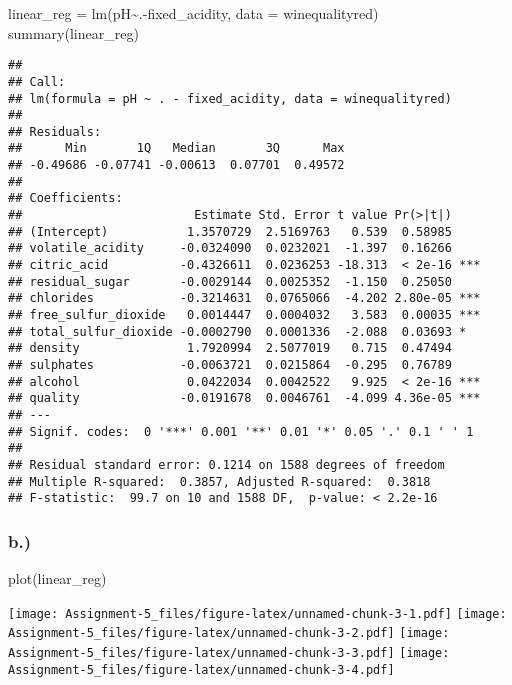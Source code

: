 \documentclass[
]{article}
\newenvironment{Shaded}{\begin{snugshade}}{\end{snugshade}}
\newcommand{\AttributeTok}[1]{\textcolor[rgb]{0.77,0.63,0.00}{#1}}
\newcommand{\FunctionTok}[1]{\textcolor[rgb]{0.00,0.00,0.00}{#1}}
\newcommand{\NormalTok}[1]{#1}
\newcommand{\OtherTok}[1]{\textcolor[rgb]{0.56,0.35,0.01}{#1}}
\newcommand{\SpecialCharTok}[1]{\textcolor[rgb]{0.00,0.00,0.00}{#1}}
\begin{document}
\begin{Shaded}
\begin{Highlighting}[]
\NormalTok{linear\_reg }\OtherTok{=} \FunctionTok{lm}\NormalTok{(pH}\SpecialCharTok{\textasciitilde{}}\NormalTok{.}\SpecialCharTok{{-}}\NormalTok{fixed\_acidity, }\AttributeTok{data =}\NormalTok{ winequalityred)}
\FunctionTok{summary}\NormalTok{(linear\_reg)}
\end{Highlighting}
\end{Shaded}

\begin{verbatim}
## 
## Call:
## lm(formula = pH ~ . - fixed_acidity, data = winequalityred)
## 
## Residuals:
##      Min       1Q   Median       3Q      Max 
## -0.49686 -0.07741 -0.00613  0.07701  0.49572 
## 
## Coefficients:
##                        Estimate Std. Error t value Pr(>|t|)    
## (Intercept)           1.3570729  2.5169763   0.539  0.58985    
## volatile_acidity     -0.0324090  0.0232021  -1.397  0.16266    
## citric_acid          -0.4326611  0.0236253 -18.313  < 2e-16 ***
## residual_sugar       -0.0029144  0.0025352  -1.150  0.25050    
## chlorides            -0.3214631  0.0765066  -4.202 2.80e-05 ***
## free_sulfur_dioxide   0.0014447  0.0004032   3.583  0.00035 ***
## total_sulfur_dioxide -0.0002790  0.0001336  -2.088  0.03693 *  
## density               1.7920994  2.5077019   0.715  0.47494    
## sulphates            -0.0063721  0.0215864  -0.295  0.76789    
## alcohol               0.0422034  0.0042522   9.925  < 2e-16 ***
## quality              -0.0191678  0.0046761  -4.099 4.36e-05 ***
## ---
## Signif. codes:  0 '***' 0.001 '**' 0.01 '*' 0.05 '.' 0.1 ' ' 1
## 
## Residual standard error: 0.1214 on 1588 degrees of freedom
## Multiple R-squared:  0.3857, Adjusted R-squared:  0.3818 
## F-statistic:  99.7 on 10 and 1588 DF,  p-value: < 2.2e-16
\end{verbatim}

\hypertarget{b.}{%
\subsubsection{b.)}\label{b.}}

\begin{Shaded}
\begin{Highlighting}[]
\FunctionTok{plot}\NormalTok{(linear\_reg)}
\end{Highlighting}
\end{Shaded}

\texttt{[image: Assignment-5\_files/figure-latex/unnamed-chunk-3-1.pdf]}
\texttt{[image: Assignment-5\_files/figure-latex/unnamed-chunk-3-2.pdf]}
\texttt{[image: Assignment-5\_files/figure-latex/unnamed-chunk-3-3.pdf]}
\texttt{[image: Assignment-5\_files/figure-latex/unnamed-chunk-3-4.pdf]}
\end{document}
